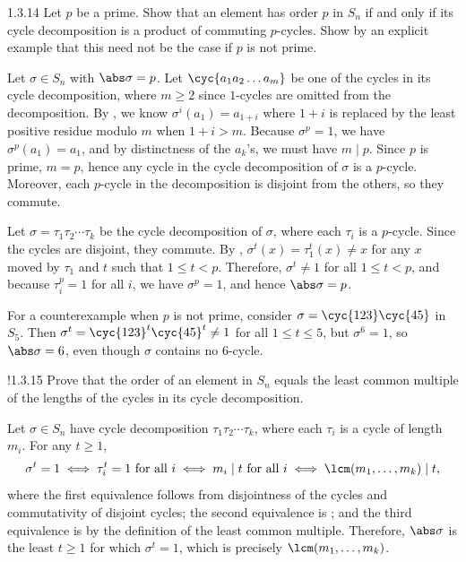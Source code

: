 \begin{exercise}{1.3.14}
    Let $p$ be a prime.
	Show that an element has order $p$ in $S_n$ if and only if its cycle decomposition is a product of commuting $p$-cycles.
	Show by an explicit example that this need not be the case if $p$ is not prime.
\end{exercise}

\begin{sol}
    \leavevmode

    \rightimp Let $\sigma \in S_n$ with $\abs\sigma = p$.
	Let $\cyc{a_1 a_2 \ldots{} a_m}$ be one of the cycles in its cycle decomposition, where $m \geq 2$ since $1$-cycles are omitted from the decomposition.
	By , we know $\sigma^i(a_1) = a_{1 + i}$ where $1 + i$ is replaced by the least positive residue modulo $m$ when $1 + i > m$.
	Because $\sigma^p = 1$, we have $\sigma^p(a_1) = a_1$, and by distinctness of the $a_k$'s, we must have $m \mid p$.
	Since $p$ is prime, $m = p$, hence any cycle in the cycle decomposition of $\sigma$ is a $p$-cycle.
    Moreover, each $p$-cycle in the decomposition is disjoint from the others, so they commute.

    \leftimp Let $\sigma = \tau_1\tau_2 \cdots \tau_k$ be the cycle decomposition of $\sigma$, where each $\tau_i$ is a $p$-cycle.
	Since the cycles are disjoint, they commute.
	By , $\sigma^t(x) = \tau_1^t(x) \neq x$ for any $x$ moved by $\tau_1$ and $t$ such that $1 \leq t < p$.
	Therefore, $\sigma^t \neq 1$ for all $1 \leq t < p$, and because $\tau_i^p = 1$ for all $i$, we have $\sigma^p = 1$, and hence $\abs\sigma = p$.

    For a counterexample when $p$ is not prime, consider $\sigma = \cyc{1 2 3}\cyc{4 5}$ in $S_5$.
	Then $\sigma^t = \cyc{1 2 3}^t \cyc{4 5}^t \neq 1$ for all $1 \leq t \leq 5$, but $\sigma^6 = 1$, so $\abs\sigma = 6$, even though $\sigma$ contains no $6$-cycle.
\end{sol}

\begin{exercise}!{1.3.15}
    Prove that the order of an element in $S_n$ equals the least common multiple of the lengths of the cycles in its cycle decomposition.
\end{exercise}

\begin{sol}
    Let $\sigma \in S_n$ have cycle decomposition $\tau_1\tau_2 \cdots \tau_k$, where each $\tau_i$ is a cycle of length $m_i$.
    For any $t \geq 1$,
    \[
        \sigma^t = 1 \iff \tau_i^t = 1 \text{ for all } i \iff m_i \mid t \text{ for all } i \iff \lcm(m_1, \ldots, m_k) \mid t,
    \]
    where the first equivalence follows from disjointness of the cycles and commutativity of disjoint cycles;
    the second equivalence is ;
    and the third equivalence is by the definition of the least common multiple.
    Therefore, $\abs\sigma$ is the least $t \geq 1$ for which $\sigma^t = 1$, which is precisely $\lcm(m_1, \ldots, m_k)$.
\end{sol}

